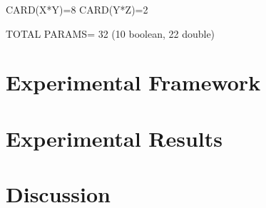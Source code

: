 CARD(X*Y)=8
CARD(Y*Z)=2

TOTAL PARAMS= 32 (10 boolean, 22 double)

\section{Experimental Framework}
\label{sec:chp3-experimental}

\section{Experimental Results}
\label{sec:chp3-results}

\section{Discussion}
\label{sec:chp3-discussion}

